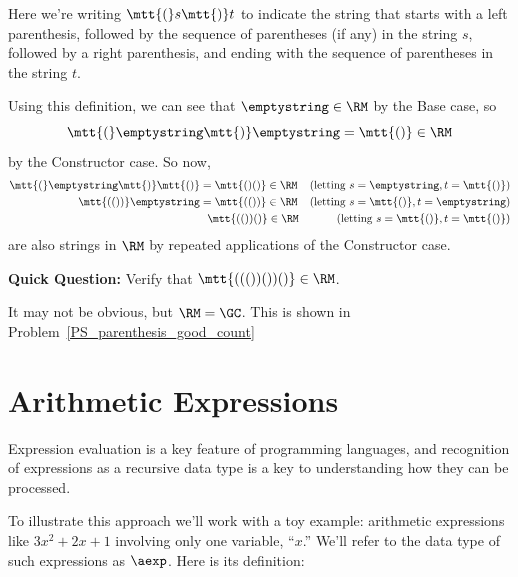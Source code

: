 Here we're writing $\mtt{(}s\mtt{)}t$ to indicate the string that
starts with a left parenthesis, followed by the sequence of parentheses
(if any) in the string $s$, followed by a right parenthesis, and ending
with the sequence of parentheses in the string $t$.

Using this definition, we can see that $\emptystring \in\RM$ by the Base
case, so
\[
\mtt{(}\emptystring\mtt{)}\emptystring=\mtt{()}\in\RM
\]
by the Constructor case.  So now,
\begin{align*}
\mtt{(}\emptystring\mtt{)}\mtt{()} &= \mtt{()()} \in \RM
    & \text{(letting $s = \emptystring, t = \mtt{()}$)}\\
\mtt{(())}\emptystring & = \mtt{(())} \in \RM
    & \text{(letting $s = \mtt{()}, t = \emptystring$)}\\
&\ \ \mtt{(())()} \in \RM
    & \text{(letting $s = \mtt{()}, t = \mtt{()}$)}
\end{align*}
are also strings in $\RM$ by repeated applications of the Constructor
case.

\textbf{Quick Question:} Verify that $\mtt{((())())()} \in \RM$.

It may not be obvious, but $\RM = \GC$.  This is shown in
Problem~\ref{PS_parenthesis_good_count}

\section{Arithmetic Expressions}
Expression evaluation is a key feature of programming languages, and
recognition of expressions as a recursive data type is a key to
understanding how they can be processed.

To illustrate this approach we'll work with a toy example: arithmetic
expressions like $3x^2 + 2x + 1$ involving only one variable, ``$x$.''
We'll refer to the data type of such expressions as $\aexp$.  Here is its
definition:

